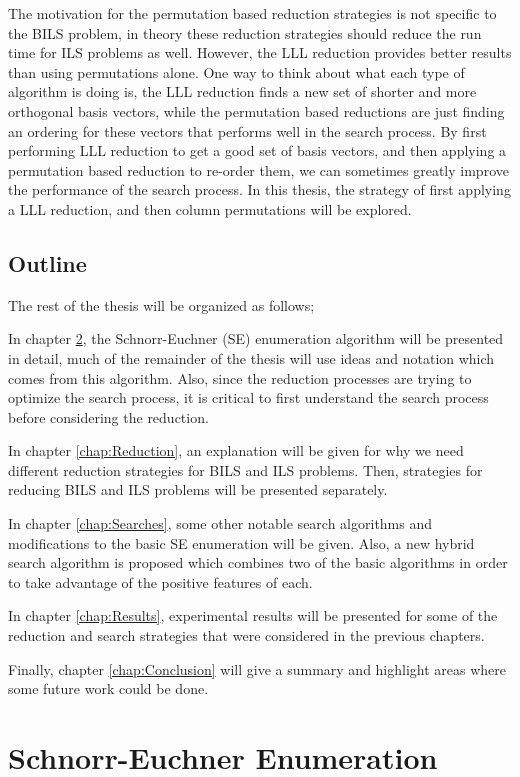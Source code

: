 \documentclass[12pt,Bold,letterpaper]{mcgilletdclass}
\begin{document}
The motivation for the permutation based reduction strategies is not specific to the BILS problem, in theory these reduction strategies should reduce the run time for ILS problems as well. However, the LLL reduction provides better results than using permutations alone. One way to think about what each type of algorithm is doing is, the LLL reduction finds a new set of shorter and more orthogonal basis vectors, while the permutation based reductions are just finding an ordering for these vectors that performs well in the search process. By first performing LLL reduction to get a good set of basis vectors, and then applying a permutation based reduction to re-order them, we can sometimes greatly improve the performance of the search process. In this thesis, the strategy of first applying a LLL reduction, and then column permutations will be explored.

\section{Outline}
The rest of the thesis will be organized as follows;

In chapter \ref{chap:SESearch}, the Schnorr-Euchner (SE) enumeration algorithm \cite{SchE94} will be presented in detail, much of the remainder of the thesis will use ideas and notation which comes from this algorithm. Also, since the reduction processes are trying to optimize the search process, it is critical to first understand the search process before considering the reduction.

In chapter \ref{chap:Reduction}, an explanation will be given for why we need different reduction strategies for BILS and ILS problems. Then, strategies for reducing BILS and ILS problems will be presented separately.

In chapter \ref{chap:Searches}, some other notable search algorithms and modifications to the basic SE enumeration will be given. Also, a new hybrid search algorithm is proposed which combines two of the basic algorithms in order to take advantage of the positive features of each.

In chapter \ref{chap:Results}, experimental results will be presented for some of the reduction and search strategies that were considered in the previous chapters.

Finally, chapter \ref{chap:Conclusion} will give a summary and highlight areas where some future work could be done.

\chapter{Schnorr-Euchner Enumeration} \label{chap:SESearch}
\end{document}
